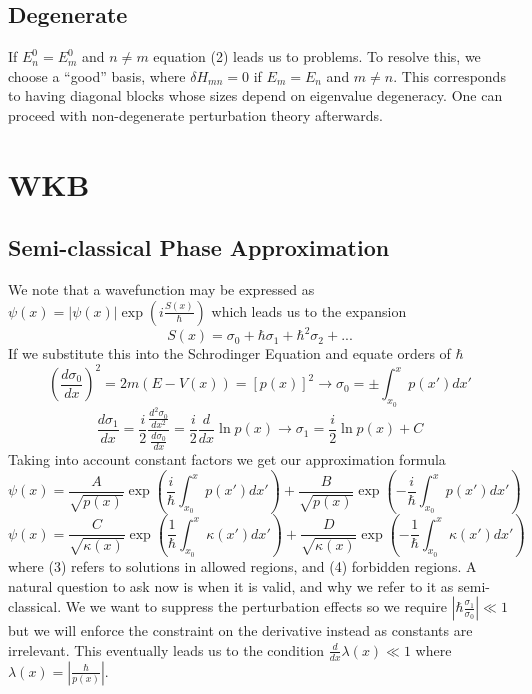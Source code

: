 \documentclass{article}
\begin{document}
\subsection{Degenerate}
If $E_n^0 = E_m^0$ and $n\neq m$ equation (2) leads us to problems. To resolve this, we choose a ``good'' basis, where $\delta H_{mn} = 0$ if $E_m = E_n$ and $m\neq n$. This corresponds to having diagonal blocks whose sizes depend on eigenvalue degeneracy. One can proceed with non-degenerate perturbation theory afterwards.
\section{WKB}
\subsection{Semi-classical Phase Approximation}
We note that a wavefunction may be expressed as $\psi(x)=|\psi(x)|\exp\left(i\frac{S(x)}{\hbar}\right)$ which leads us to the expansion
$$S(x) = \sigma_0 + \hbar \sigma_1 + \hbar^2 \sigma_2 + ... $$
If we substitute this into the Schrodinger Equation and equate orders of $\hbar$
$$\left(\frac{d \sigma_0}{dx}\right)^2 =2m (E-V(x)) = [p(x)]^2 \rightarrow\sigma_0 =  \pm \int^x_{x_0} p(x') dx' $$
$$\frac{ d \sigma_1}{dx} = \frac{i}{2} \frac{\frac{d^2 \sigma_0}{dx^2}}{\frac{d\sigma_0}{dx}}=\frac{i}{2}\frac{d}{dx}\ln p(x)\rightarrow \sigma_1 = \frac{i}{2}\ln p(x) + C$$
Taking into account constant factors we get our approximation formula
\begin{equation}
\boxed{\psi(x) = \frac{A}{\sqrt{p(x)}} \exp\left(\frac{i}{\hbar}\int_{x_0}^{x} p(x') dx' \right) + \frac{B}{\sqrt{p(x)}} \exp\left(-\frac{i}{\hbar}\int_{x_0}^{x} p(x') dx' \right)}
\end{equation}
\begin{equation}
\boxed{\psi(x) = \frac{C}{\sqrt{\kappa(x)}} \exp\left(\frac{1}{\hbar}\int_{x_0}^{x} \kappa(x') dx' \right) + \frac{D}{\sqrt{\kappa(x)}} \exp\left(-\frac{1}{\hbar}\int_{x_0}^{x} \kappa(x') dx' \right)}
\end{equation}
where (3) refers to solutions in allowed regions, and (4) forbidden regions. A natural question to ask now is when it is valid, and why we refer to it as semi-classical. We we want to suppress the perturbation effects so we require $|\hbar \frac{\sigma_1}{\sigma_0}| \ll 1$ but we will enforce the constraint on the derivative instead as constants are irrelevant.
This eventually leads us to the condition $\boxed{\frac{d}{dx} \lambda(x) \ll 1}$ where $\lambda(x)=\left|\frac{\hbar}{p(x)}\right|$. 
\end{document}
